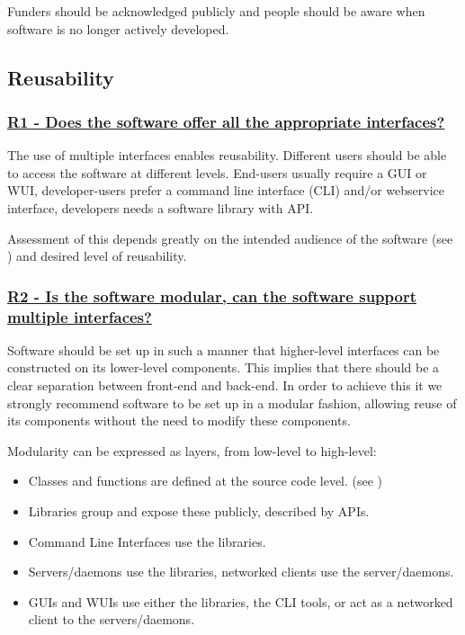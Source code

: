 \documentclass[a4paper,11pt]{article}
\newcommand{\criterion}[2]{\subsubsection*{\underline{#1 - #2}}\label{id:#1}}
\newcommand\CheckTable{%
  \begin{tabular}{ccccc}
    No & Minimal & Adequate & Good & Perfect \\
    0 & 1 & 2 & 3 & 4 \\
    \hline
    $\square$ & $\square$ & $\square$ & $\square$ & $\square$ \\
  \end{tabular}%
}
\newcommand{\refcrit}[1]{%
 \framebox[1.1\width]{\hyperref[id:#1]{#1}}
}
\begin{document}
Funders should be acknowledged publicly and people should be aware when
software is no longer actively developed.


\subsection{Reusability}\label{sec:reu}

\newcommand{\rOneID}{R1}
\newcommand{\rOneText}{Does the software offer all the appropriate interfaces?}
\criterion{\rOneID}{\rOneText}

The use of multiple interfaces enables reusability. Different users should be
able to access the software at different levels. End-users usually require a
GUI or WUI, developer-users prefer a command line interface (CLI) and/or
webservice interface, developers needs a software library with API.

Assessment of this depends greatly on the intended audience of the software
(see \refcrit{U2}) and desired level of reusability.


\newcommand{\rTwoID}{R2}
\newcommand{\rTwoText}{Is the software modular, can the software support multiple interfaces?}
\criterion{\rTwoID}{\rTwoText}

Software should be set up in such a manner that higher-level interfaces can be
constructed on its lower-level components. This implies that there should be a
clear separation between front-end and back-end. In order to achieve this it we
strongly recommend software to be set up in a modular fashion, allowing reuse
of its components without the need to modify these components.

Modularity can be expressed as layers, from low-level to high-level:

\begin{itemize}
 \item Classes and functions are defined at the source code level. (see
     \refcrit{R3})
 \item Libraries group and expose these publicly, described by APIs. 
 \item Command Line Interfaces use the libraries.
 \item Servers/daemons use the libraries, networked clients use the server/daemons.
 \item GUIs and WUIs use either the libraries, the CLI tools, or act as a networked client to the servers/daemons.
\end{itemize}
\end{document}
